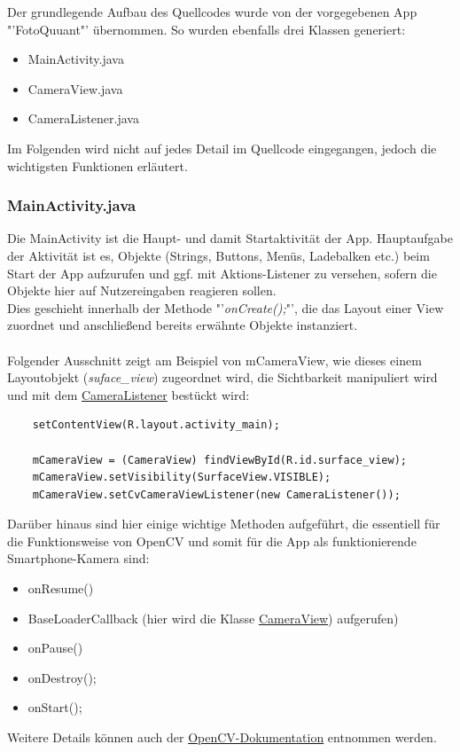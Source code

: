 Der grundlegende Aufbau des Quellcodes wurde von der vorgegebenen App "'FotoQuuant"' übernommen. So wurden ebenfalls drei Klassen generiert:
\begin{itemize}
	\item MainActivity.java
	\item CameraView.java
	\item CameraListener.java
\end{itemize}
Im Folgenden wird nicht auf jedes Detail im Quellcode eingegangen, jedoch die wichtigsten Funktionen erläutert.

\subsubsection{MainActivity.java}
\label{mainactivity}

Die MainActivity ist die Haupt- und damit Startaktivität der App. Hauptaufgabe der Aktivität ist es, Objekte  (Strings, Buttons, Menüs, Ladebalken etc.) beim Start der App aufzurufen und ggf. mit Aktions-Listener zu versehen, sofern die Objekte hier auf Nutzereingaben reagieren sollen. \\
Dies geschieht innerhalb der Methode "'\textit{onCreate();}"', die das Layout einer View zuordnet und anschließend bereits erwähnte Objekte instanziert. \\
\\
Folgender Ausschnitt zeigt am Beispiel von mCameraView, wie dieses einem Layoutobjekt (\textcolor{lila}{\textit{suface\_view}})  zugeordnet wird, die Sichtbarkeit manipuliert wird und mit dem \hyperref[CameraListener]{CameraListener}  bestückt wird:

\lstset{language = JAVA}

\begin{lstlisting}
	setContentView(R.layout.activity_main);
		
	mCameraView = (CameraView) findViewById(R.id.surface_view);
	mCameraView.setVisibility(SurfaceView.VISIBLE);
	mCameraView.setCvCameraViewListener(new CameraListener());
\end{lstlisting}

Darüber hinaus sind hier einige wichtige Methoden aufgeführt, die essentiell für die Funktionsweise von OpenCV und somit für die App als funktionierende Smartphone-Kamera sind:
\begin{itemize}
\item onResume()
\item BaseLoaderCallback (hier wird die Klasse \hyperref[CameraView]{CameraView}) aufgerufen)
\item onPause()
\item onDestroy();
\item onStart();
\end{itemize}
Weitere Details können auch der \href{http://docs.opencv.org/2.4/doc/tutorials/introduction/android_binary_package/dev_with_OCV_on_Android.html#dev-with-ocv-on-android}{OpenCV-Dokumentation} entnommen werden.


